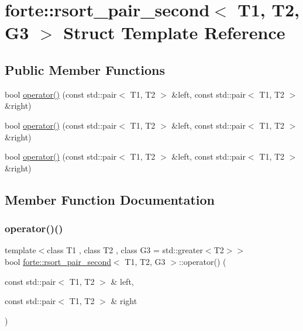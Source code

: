 \hypertarget{structforte_1_1rsort__pair__second}{}\section{forte\+:\+:rsort\+\_\+pair\+\_\+second$<$ T1, T2, G3 $>$ Struct Template Reference}
\label{structforte_1_1rsort__pair__second}
\subsection*{Public Member Functions}
\begin{DoxyCompactItemize}
\item 
bool \mbox{\hyperlink{structforte_1_1rsort__pair__second_a041ae6341761974fbda05cb907597fd7}{operator()}} (const std\+::pair$<$ T1, T2 $>$ \&left, const std\+::pair$<$ T1, T2 $>$ \&right)
\item 
bool \mbox{\hyperlink{structforte_1_1rsort__pair__second_a041ae6341761974fbda05cb907597fd7}{operator()}} (const std\+::pair$<$ T1, T2 $>$ \&left, const std\+::pair$<$ T1, T2 $>$ \&right)
\item 
bool \mbox{\hyperlink{structforte_1_1rsort__pair__second_a041ae6341761974fbda05cb907597fd7}{operator()}} (const std\+::pair$<$ T1, T2 $>$ \&left, const std\+::pair$<$ T1, T2 $>$ \&right)
\end{DoxyCompactItemize}


\subsection{Member Function Documentation}
\mbox{\label{structforte_1_1rsort__pair__second_a041ae6341761974fbda05cb907597fd7}} 
\subsubsection{\texorpdfstring{operator()()}{operator()()}\hspace{0.1cm}{\footnotesize\ttfamily [1/3]}}
{\footnotesize\ttfamily template$<$class T1 , class T2 , class G3  = std\+::greater$<$\+T2$>$$>$ \\
bool \mbox{\hyperlink{structforte_1_1rsort__pair__second}{forte\+::rsort\+\_\+pair\+\_\+second}}$<$ T1, T2, G3 $>$\+::operator() (\begin{DoxyParamCaption}\item[{const std\+::pair$<$ T1, T2 $>$ \&}]{left,  }\item[{const std\+::pair$<$ T1, T2 $>$ \&}]{right }\end{DoxyParamCaption})\hspace{0.3cm}{\ttfamily [inline]}}

